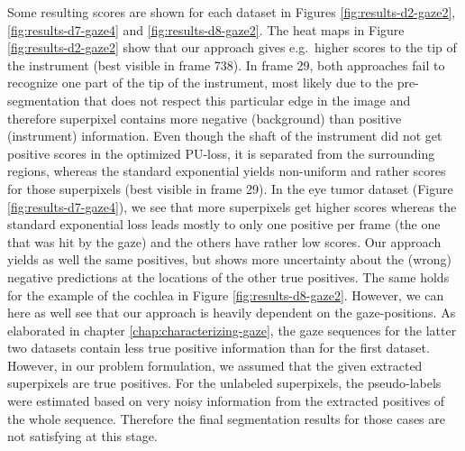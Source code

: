 Some resulting scores are shown for each dataset in Figures \ref{fig:results-d2-gaze2}, \ref{fig:results-d7-gaze4} and \ref{fig:results-d8-gaze2}. 
The heat maps in Figure \ref{fig:results-d2-gaze2} show that our approach gives e.g.\ higher scores to the tip of the instrument (best visible in frame 738). 
In frame 29, both approaches fail to recognize one part of the tip of the instrument, most likely due to the pre-segmentation that does not respect this particular edge in the image and therefore superpixel contains more negative (background) than positive (instrument) information. Even though the shaft of the instrument did not get positive scores in the optimized PU-loss, it is separated from the surrounding regions, whereas the standard exponential yields non-uniform and rather scores for those superpixels (best visible in frame 29).
In the eye tumor dataset (Figure \ref{fig:results-d7-gaze4}), we see that more superpixels get higher scores whereas the standard exponential loss leads mostly to only one positive per frame (the one that was hit by the gaze) and the others have rather low scores. 
Our approach yields as well the same positives, but shows more uncertainty about the (wrong) negative predictions at the locations of the other true positives. 
The same holds for the example of the cochlea in Figure \ref{fig:results-d8-gaze2}. 
However, we can here as well see that our approach is heavily dependent on the gaze-positions. As elaborated in chapter \ref{chap:characterizing-gaze}, the gaze sequences for the latter two datasets contain less true positive information than for the first dataset. However, in our problem formulation, we assumed that the given extracted superpixels are true positives. For the unlabeled superpixels, the pseudo-labels were estimated based on very noisy information from the extracted positives of the whole sequence. Therefore the final segmentation results for those cases are not satisfying at this stage.

